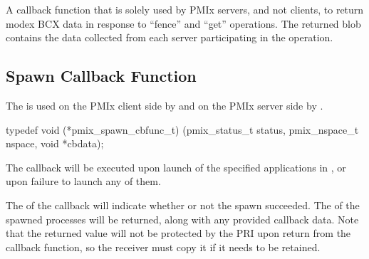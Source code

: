 \begin{arglist}
\end{arglist}

\descr

A callback function that is solely used by PMIx servers, and not clients, to return modex \ac{BCX} data in response to ``fence'' and ``get'' operations.
The returned blob contains the data collected from each server participating in the operation.



\subsection{Spawn Callback Function}

\summary

The  is used on the PMIx client side by  and on the PMIx server side by .

\cspecificstart
\begin{codepar}
typedef void (*pmix_spawn_cbfunc_t)
    (pmix_status_t status,
     pmix_nspace_t nspace, void *cbdata);
\end{codepar}
\cspecificend

\begin{arglist}
\end{arglist}


\descr

The callback will be executed upon launch of the specified applications in , or upon failure to launch any of them.

The  of the callback will indicate whether or not the spawn succeeded.
The  of the spawned processes will be returned, along with any provided callback data.
Note that the returned  value will not be protected by the \ac{PRI} upon return from the callback function, so the receiver must copy it if it needs to be retained.


